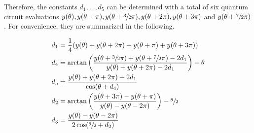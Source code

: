 Therefore, the constants $d_1, \dots, d_5$ can be determined with a total of six
quantum circuit evaluations
$y(\theta), y(\theta + \pi), y(\theta + \sfrac32\pi), y(\theta + 2\pi), y(\theta + 3\pi)$
and $y(\theta + \sfrac72\pi)$.
For convenience, they are summarized in the following.

\begin{subequations}
    \label{eq:constants}
    \begin{align}
        d_1 &= \frac14 (y(\theta) + y(\theta + 2\pi) + y(\theta + \pi) + y(\theta + 3\pi))
            \label{eq:constants-d1}\\
        d_4 &= \arctan\left(\frac{y(\theta + \sfrac32 \pi) + y(\theta + \sfrac72 \pi) - 2 d_1}{y(\theta) + y(\theta + 2\pi) - 2 d_1}\right) - \theta
            \label{eq:constants-d4}\\
        d_5 &= \frac{y(\theta) + y(\theta + 2\pi) - 2 d_1}{\cos(\theta + d_4)}
            \label{eq:constants-d5}\\
        d_2 &= \arctan\left(\frac{y(\theta + 3\pi) - y(\theta + \pi)}{y(\theta) - y(\theta - 2\pi)}\right) - \sfrac\theta2
            \label{eq:constants-d2}\\
        d_3 &= \frac{y(\theta) - y(\theta - 2\pi)}{2 \cos(\sfrac\theta2 + d_2)}
            \label{eq:constants-d3}
    \end{align}
\end{subequations}
